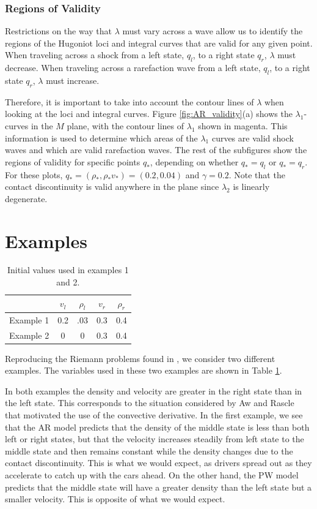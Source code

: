 \documentclass{article}
\begin{document}
\subsubsection{Regions of Validity}
Restrictions on the way that $\lambda$ must vary across a wave allow us to identify the regions of the Hugoniot loci and integral curves that are valid for any given point. When traveling across a shock from a left state, $q_l$, to a right state $q_r$, $\lambda$ must decrease. When traveling across a rarefaction wave from a left state, $q_l$, to a right state $q_r$, $\lambda$ must increase. 

Therefore, it is important to take into account the contour lines of $\lambda$ when 
looking at the loci and integral curves. Figure \ref{fig:AR_validity}(a) 
shows the $\lambda_1$-curves in the $M$ plane,
with the contour lines of $\lambda_1$ shown in magenta. This information is used
to determine which areas of the $\lambda_1$ curves are valid shock waves and which
are valid rarefaction waves. The rest of the subfigures show the regions of validity for 
specific points $q_*$, depending on whether $q_* = q_l$ or $q_* = q_r$. For these plots,
$q_* = (\rho_*,\rho_*v_*) = (0.2, 0.04)$ and $\gamma = 0.2$. Note that the contact discontinuity is valid
anywhere in the plane since $\lambda_2$ is linearly degenerate.

\section{Examples}

\begin{table}[t]
\caption{Initial values used in examples 1 and 2.}
\begin{center}
\begin{tabular}{| c | c c  c c|}
\hline
& $v_l$ & $\rho_l $ & $v_r$ & $\rho_r $\\
\hline
Example 1 & 0.2 & .03 & 0.3 & 0.4 \\
Example 2 & 0 & 0 & 0.3 & 0.4\\
\hline
\end{tabular}
\end{center}
 \label{table:1}
\end{table}

Reproducing the Riemann problems found in \cite{AwRascle2000}, we consider two different examples. The variables used in these two examples are shown in Table \ref{table:1}.

In both examples the density and velocity are greater in the right state than in the left state.  This corresponds to the situation considered by Aw and Rascle that motivated the use of the convective derivative.  In the first example, we see that the AR model predicts that the density of the middle state is less than both left or right states, but that the velocity increases steadily from left state to the middle state and then remains constant while the density changes due to the contact discontinuity.  This is what we would expect, as drivers spread out as they accelerate to catch up with the cars ahead.  On the other hand, the PW model predicts that the middle state will have a greater density than the left state but a smaller velocity.  This is opposite of what we would expect.
\end{document}
